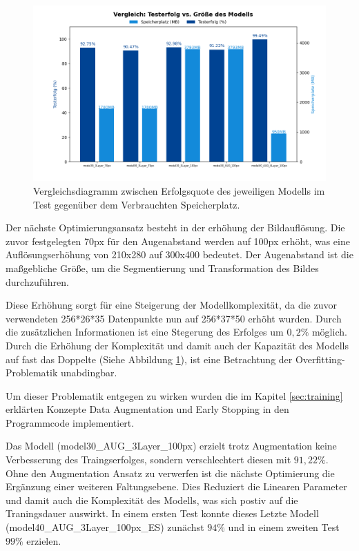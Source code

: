 \documentclass[journal,twoside,web]{ieeecolor}
\begin{document}
\begin{figure}[H]
    \centerline{\includegraphics[width=\columnwidth]{Erfolg_Groesse.png}}
    \caption{Vergleichsdiagramm zwischen Erfolgsquote des jeweiligen Modells im Test gegenüber dem Verbrauchten Speicherplatz.}
    \label{fig:compareSize}
\end{figure}

Der nächste Optimierungsansatz besteht in der erhöhung der Bildauflösung. Die zuvor festgelegten 70px für den Augenabstand werden auf 100px erhöht, was eine Auflösungserhöhung von 210x280 auf 300x400 bedeutet.
Der Augenabstand ist die maßgebliche Größe, um die Segmentierung und Transformation des Bildes durchzuführen.

Diese Erhöhung sorgt für eine Steigerung der Modellkomplexität, da die zuvor verwendeten 256*26*35 Datenpunkte nun auf 256*37*50 erhöht wurden. 
Durch die zusätzlichen Informationen ist eine Stegerung des Erfolges um $0,2\%$ möglich. Durch die Erhöhung der Komplexität und damit auch der Kapazität des Modells auf fast das Doppelte (Siehe Abbildung \ref{fig:compareSize}), ist eine Betrachtung der Overfitting-Problematik unabdingbar.

Um dieser Problematik entgegen zu wirken wurden die im Kapitel \ref{sec:training} erklärten Konzepte Data Augmentation und Early Stopping in den Programmcode implementiert.

Das Modell (model30\_AUG\_3Layer\_100px) erzielt trotz Augmentation keine Verbesserung des Traingserfolges, sondern verschlechtert diesen mit $91,22\%$. 
Ohne den Augmentation Ansatz zu verwerfen ist die nächste Optimierung die Ergänzung einer weiteren Faltungsebene. 
Dies Reduziert die Linearen Parameter und damit auch die Komplexität des Modells, was sich postiv auf die Traningsdauer auswirkt. 
In einem ersten Test konnte dieses Letzte Modell (model40\_AUG\_3Layer\_100px\_ES) zunächst $94\%$ und in einem zweiten Test $99\%$ erzielen.
\end{document}
